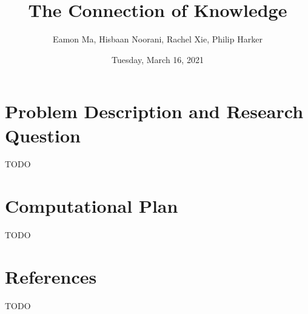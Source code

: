 \documentclass[fontsize=11pt]{article}
\title{The Connection of Knowledge}
\author{Eamon Ma, Hisbaan Noorani, Rachel Xie, Philip Harker}
\date{Tuesday, March 16, 2021}
\begin{document}
\maketitle

\section*{Problem Description and Research Question}

TODO

\section*{Computational Plan}

TODO

\section*{References}

TODO

\newpage
\nocite{*}
\printbibliography[title={\centering References}]
\end{document}
